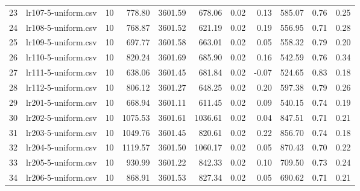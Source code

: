 \begin{tabular}{llrrrrrrrrr}
23 &   lr107-5-uniform.csv &         10 &           778.80 &     3601.59 &             678.06 &           0.02 &      0.13 &              585.07 &            0.76 &       0.25 \\
24 &   lr108-5-uniform.csv &         10 &           768.87 &     3601.52 &             621.19 &           0.02 &      0.19 &              556.95 &            0.71 &       0.28 \\
25 &   lr109-5-uniform.csv &         10 &           697.77 &     3601.58 &             663.01 &           0.02 &      0.05 &              558.32 &            0.79 &       0.20 \\
26 &   lr110-5-uniform.csv &         10 &           820.24 &     3601.69 &             685.90 &           0.02 &      0.16 &              542.59 &            0.76 &       0.34 \\
27 &   lr111-5-uniform.csv &         10 &           638.06 &     3601.45 &             681.84 &           0.02 &     -0.07 &              524.65 &            0.83 &       0.18 \\
28 &   lr112-5-uniform.csv &         10 &           806.12 &     3601.27 &             648.25 &           0.02 &      0.20 &              597.38 &            0.79 &       0.26 \\
29 &   lr201-5-uniform.csv &         10 &           668.94 &     3601.11 &             611.45 &           0.02 &      0.09 &              540.15 &            0.74 &       0.19 \\
30 &   lr202-5-uniform.csv &         10 &          1075.53 &     3601.61 &            1036.61 &           0.02 &      0.04 &              847.51 &            0.71 &       0.21 \\
31 &   lr203-5-uniform.csv &         10 &          1049.76 &     3601.45 &             820.61 &           0.02 &      0.22 &              856.70 &            0.74 &       0.18 \\
32 &   lr204-5-uniform.csv &         10 &          1119.57 &     3601.50 &            1060.17 &           0.02 &      0.05 &              870.43 &            0.70 &       0.22 \\
33 &   lr205-5-uniform.csv &         10 &           930.99 &     3601.22 &             842.33 &           0.02 &      0.10 &              709.50 &            0.73 &       0.24 \\
34 &   lr206-5-uniform.csv &         10 &           868.91 &     3601.53 &             827.34 &           0.02 &      0.05 &              690.62 &            0.71 &       0.21 \\

\end{tabular}
